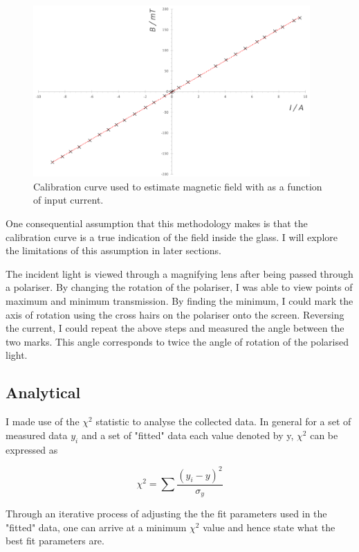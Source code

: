 \documentclass{article}%
\begin{document}
\begin{figure}[H]%
    \centering%
    \includegraphics[width=400px]{calibration_curve.png}%
    \caption{Calibration curve used to estimate magnetic field with as a function of input current.}%
\end{figure}

One consequential assumption that this methodology makes is that the calibration curve is a true indication of the field inside the glass. I will explore the limitations of this assumption in later sections.

The incident light is viewed through a magnifying lens after being passed through a polariser. By changing the rotation of the polariser, I was able to view points of maximum and minimum transmission. By finding the minimum, I could mark the axis of rotation using the cross hairs on the polariser onto the screen. Reversing the current, I could repeat the above steps and measured the angle between the two marks. 
This angle corresponds to twice the angle of rotation of the polarised light.

\subsection{Analytical}

I made use of the $\chi^{2}$ statistic to analyse the collected data. In general for a set of measured data $y_{i}$ and a set of "fitted" data each value denoted by y, $\chi^2$ can be expressed as 

\begin{equation}
   \chi^{2} = \sum{\frac{(y_{i}- y)^2}{\sigma_y}}
\end{equation}

Through an iterative process of adjusting the the fit parameters used in the "fitted" data, one can arrive at a minimum $\chi^2$ value and hence state what the best fit parameters are.
\end{document}
